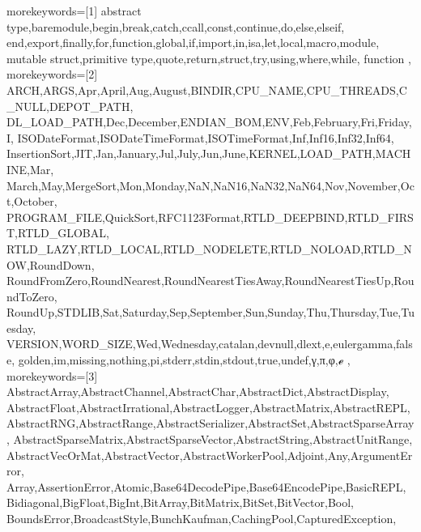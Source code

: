 \newcommand{\jul}{\textcolor{julia}{julia> }}


\newenvironment{repl}
{\fontfamily{cmvtt}\selectfont \begin{mdframed}

}{\end{mdframed}}

\usepackage[linewidth=1pt]{mdframed}


\renewcommand{\arraystretch}{1.3}

{%
%
%
morekeywords=[1]
{%
abstract type,baremodule,begin,break,catch,ccall,const,continue,do,else,elseif,%
end,export,finally,for,function,global,if,import,in,isa,let,local,macro,module,%
mutable struct,primitive type,quote,return,struct,try,using,where,while, function%
},%
%
%
morekeywords=[2]
{%
ARCH,ARGS,Apr,April,Aug,August,BINDIR,CPU_NAME,CPU_THREADS,C_NULL,DEPOT_PATH,%
DL_LOAD_PATH,Dec,December,ENDIAN_BOM,ENV,Feb,February,Fri,Friday,I,%
ISODateFormat,ISODateTimeFormat,ISOTimeFormat,Inf,Inf16,Inf32,Inf64,%
InsertionSort,JIT,Jan,January,Jul,July,Jun,June,KERNEL,LOAD_PATH,MACHINE,Mar,%
March,May,MergeSort,Mon,Monday,NaN,NaN16,NaN32,NaN64,Nov,November,Oct,October,%
PROGRAM_FILE,QuickSort,RFC1123Format,RTLD_DEEPBIND,RTLD_FIRST,RTLD_GLOBAL,%
RTLD_LAZY,RTLD_LOCAL,RTLD_NODELETE,RTLD_NOLOAD,RTLD_NOW,RoundDown,%
RoundFromZero,RoundNearest,RoundNearestTiesAway,RoundNearestTiesUp,RoundToZero,%
RoundUp,STDLIB,Sat,Saturday,Sep,September,Sun,Sunday,Thu,Thursday,Tue,Tuesday,%
VERSION,WORD_SIZE,Wed,Wednesday,catalan,devnull,dlext,e,eulergamma,false,%
golden,im,missing,nothing,pi,stderr,stdin,stdout,true,undef,γ,π,φ,ℯ%
},%
%
%
morekeywords=[3]
{%
AbstractArray,AbstractChannel,AbstractChar,AbstractDict,AbstractDisplay,%
AbstractFloat,AbstractIrrational,AbstractLogger,AbstractMatrix,AbstractREPL,%
AbstractRNG,AbstractRange,AbstractSerializer,AbstractSet,AbstractSparseArray,%
AbstractSparseMatrix,AbstractSparseVector,AbstractString,AbstractUnitRange,%
AbstractVecOrMat,AbstractVector,AbstractWorkerPool,Adjoint,Any,ArgumentError,%
Array,AssertionError,Atomic,Base64DecodePipe,Base64EncodePipe,BasicREPL,%
Bidiagonal,BigFloat,BigInt,BitArray,BitMatrix,BitSet,BitVector,Bool,%
BoundsError,BroadcastStyle,BunchKaufman,CachingPool,CapturedException,%
}}
